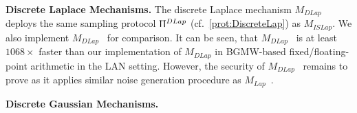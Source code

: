 \textbf{Discrete Laplace Mechanisms.}
The discrete Laplace mechanism $M_{DLap}$ deploys the same sampling protocol $\Uppi^{DLap}$ (cf.~\autoref{prot:DiscreteLap}) as $M_{ISLap}$.
We also implement $M_{DLap}$~\cite{eigner2014differentially} for comparison.
It can be seen, that $M_{DLap}$~\cite{eigner2014differentially} is at least $1068\times$ faster than our implementation of $M_{DLap}$ in BGMW-based fixed/floating-point arithmetic in the LAN setting. However, the security of $M_{DLap}$~\cite{eigner2014differentially} remains to prove as it applies similar noise generation procedure as $M_{Lap}$~\cite{eigner2014differentially}.

\textbf{Discrete Gaussian Mechanisms.}

